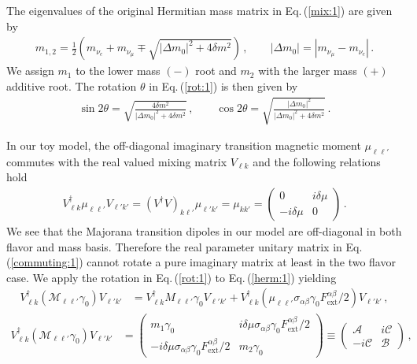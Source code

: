 \documentclass{ws-ijmpa}
\newcommand{\req}[1]{Eq.\,(\ref{#1})}
\begin{document}
The eigenvalues of the original Hermitian mass matrix in \req{mix:1} are given by
\begin{align}
\label{massroot:1}
m_{1,2}=\frac{1}{2}\left(m_{\nu_{e}}+m_{\nu_{\mu}}\mp\sqrt{|\Delta m_{0}|^{2}+4\delta m^{2}}\right)\,,\qquad
|\Delta m_{0}|=|m_{\nu_{\mu}}-m_{\nu_{e}}|\,.
\end{align}
We assign $m_{1}$ to the lower mass $(-)$ root and $m_{2}$ with the larger mass $(+)$ additive root. The rotation $\theta$ in \req{rot:1} is then given by
\begin{align}
\label{massroot:2}
\sin2\theta=\sqrt{\frac{4\delta m^{2}}{|\Delta m_{0}|^{2}+4\delta m^{2}}}\,,\qquad
\cos2\theta=\sqrt{\frac{|\Delta m_{0}|^{2}}{|\Delta m_{0}|^{2}+4\delta m^{2}}}\,.
\end{align}

In our toy model, the off-diagonal imaginary transition magnetic moment  $\mu_{\ell\ell'}$ commutes with the real valued mixing matrix $V_{\ell k}$ and the following relations hold
\begin{align}
\label{commuting:1}
V_{\ell k}^{\dag}\mu_{\ell\ell'}V_{\ell' k'}=(V^{\dag}V)_{k\ell'}\mu_{\ell'k'}=\mu_{kk'}=
\begin{pmatrix}
0 & i\delta\mu\\
-i\delta\mu & 0
\end{pmatrix}\,.
\end{align}
We see that the Majorana transition dipoles in our model are off-diagonal in both flavor and mass basis. Therefore the real parameter unitary matrix in \req{commuting:1} cannot rotate a pure imaginary matrix at least in the two flavor case. We apply the rotation in \req{rot:1} to \req{herm:1} yielding
\begin{align}
\label{herm:2}
V_{\ell k}^{\dag}(\mathcal{M}_{\ell\ell'}\gamma_{0})V_{\ell' k'} &= 
V_{\ell k}^{\dag}M_{\ell\ell'}\gamma_{0}V_{\ell' k'} +
V_{\ell k}^{\dag}(\mu_{\ell\ell'}\sigma_{\alpha\beta}\gamma_{0}F^{\alpha\beta}_\mathrm{ext}/2)V_{\ell' k'}\,,
\end{align}
%
\begin{align}
\label{herm:3}
V_{\ell k}^{\dag}(\mathcal{M}_{\ell\ell'}\gamma_{0})V_{\ell' k'} &= 
\begin{pmatrix}
m_{1}\gamma_{0} & i\delta\mu\sigma_{\alpha\beta}\gamma_{0}F^{\alpha\beta}_\mathrm{ext}/2\\
-i\delta\mu\sigma_{\alpha\beta}\gamma_{0}F^{\alpha\beta}_\mathrm{ext}/2 & m_{2}\gamma_{0}
\end{pmatrix}\equiv
\begin{pmatrix}
\mathcal{A} & i\mathcal{C}\\
-i\mathcal{C} & \mathcal{B}
\end{pmatrix}\,,
\end{align}
\end{document}
